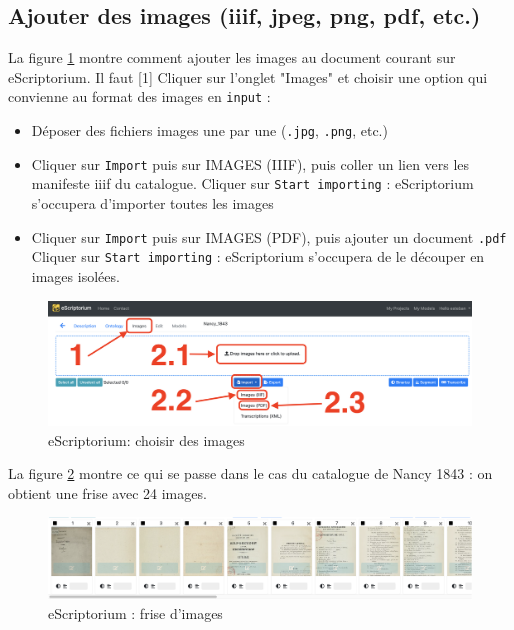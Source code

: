 \documentclass[a4paper,12pt,twoside]{book}
\begin{document}
\subsection{Ajouter des images (iiif, jpeg, png, pdf, etc.)}

La figure \ref{ajout} montre comment ajouter les images au document courant sur eScriptorium. Il faut [1] Cliquer sur l'onglet "Images" et choisir une option qui convienne au format des images en \texttt{input} :
\begin{itemize}
	\item [2.1] Déposer des fichiers images une par une (\texttt{.jpg}, \texttt{.png}, etc.)
	\item [2.2] Cliquer sur \texttt{Import} puis sur IMAGES (IIIF), puis coller un lien vers les manifeste iiif du catalogue. Cliquer sur \texttt{Start importing} : eScriptorium s'occupera d'importer toutes les images
	\item [2.3] Cliquer sur \texttt{Import} puis sur IMAGES (PDF), puis ajouter un document \texttt{.pdf} Cliquer sur \texttt{Start importing} :  eScriptorium s'occupera de le découper en images isolées.
\end{itemize}
\begin{figure}[ht]
	\centering
	\includegraphics[scale=0.3]{ajouter_images_eScriptorium.png}		
	\caption{eScriptorium: choisir des images}
	\label{ajout}
\end{figure}

La figure \ref{frise} montre ce qui se passe dans le cas du catalogue de Nancy 1843 : on obtient une frise avec 24 images.

\begin{figure}[ht]
	\centering
	\includegraphics[scale=0.3]{frize_eScriptorium.png}		
	\caption{eScriptorium : frise d'images}
	\label{frise}
\end{figure}
\end{document}
